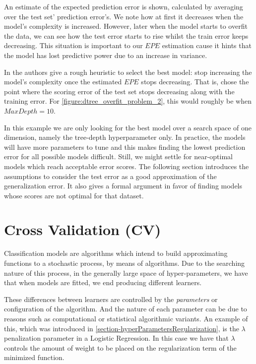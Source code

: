 An estimate of the expected prediction error is shown, calculated by averaging over the test set' prediction error's.
We note how at first it decreases when the model's complexity is increased.
However, later when the model starts to overfit the data, we can see how the test error starts to rise whilst the train error keeps decreasing.
This situation is important to our $EPE$ estimation cause it hints that the model has lost predictive power due to an increase in variance.

In \protect\citep{hastie-elemstatslearn} the authors give a rough heuristic to select the best model: stop increasing the model's complexity once the estimated $EPE$ stops decreasing.
That is, chose the point where the scoring error of the test set stops decreasing along with the training error.
For \cref{figure:dtree_overfit_problem_2}, this would roughly be when $Max Depth = 10$.

In this example we are only looking for the best model over a search space of one dimension, namely the tree-depth hyperparameter only.
In practice, the models will have more parameters to tune and this makes finding the lowest prediction error for all possible models difficult.
Still, we might settle for near-optimal models which reach acceptable error scores.
The following section introduces the assumptions to consider the test error as a good approximation of the generalization error.
It also gives a formal argument in favor of finding models whose scores are not optimal for that dataset.


\section{Cross Validation (CV)}\label{section:crossValidation}

Classification models are algorithms which intend to build approximating functions to a stochastic process, by means of algorithms.
Due to the searching nature of this process, in the generally large space of hyper-parameters, we have that when models are fitted, we end producing different learners.

These differences between learners are controlled by the \textit{parameters} or configuration of the algorithm.
And the nature of each parameter can be due to reasons such as computational or statistical  algorithmic variants.
An example of this, which was introduced in \cref{section-hyperParametersRegularization}, is the $\lambda$ penalization parameter in a Logistic Regression.
In this case we have that $\lambda$ controls the amount of weight to be placed on the regularization term of the minimized function.


